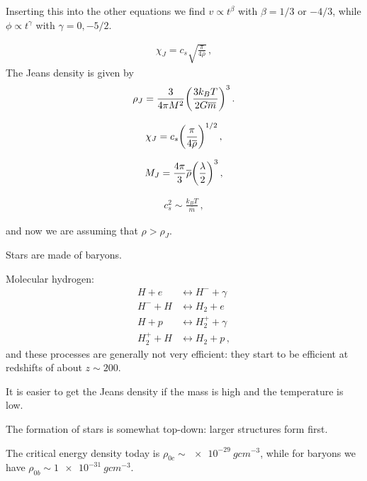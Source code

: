\documentclass[main.tex]{subfiles}
\begin{document}
Inserting this into the other equations we find \(v \propto t^{\beta } \) with \(\beta = 1/3\) or \(-4/3\), while \(\phi \propto t^{\gamma }\) with \(\gamma = 0, -5/2\). 

%
\begin{align}
    \chi_{J} = c_s \sqrt{\frac{\pi}{4 \overline{\rho}}}
  \,,
  \end{align}
%
The Jeans density is given by 
%
\begin{align}
  \rho_{J} = \frac{3}{4 \pi M^2} \qty(\frac{3k_B T}{2G \overline{m}})^{3}
\,.
\end{align}
%

%
\begin{align}
  \chi_J = c_s \qty(\frac{\pi}{4 \overline{\rho}})^{1/2}
\,,
\end{align}
%

%
\begin{align}
  M_J = \frac{4 \pi }{3} \overline{\rho} \qty(\frac{\lambda}{2})^{3}
\,,
\end{align}
%

%
\begin{align}
  c_s^2 \sim \frac{k_B T}{\overline{m}}
\,,
\end{align}
%

and now we are assuming that \(\rho > \rho _J\). 

Stars are made of baryons. 

Molecular hydrogen: 
%
\begin{subequations}
\begin{align}
  H + e &\leftrightarrow H^{-} + \gamma  \\
  H^{-} + H &\leftrightarrow H_2 + e  \\
   H+ p &\leftrightarrow H_2^{+} + \gamma  \\
  H_2^{+} + H &\leftrightarrow H_2 + p
\,,
\end{align}
\end{subequations}
%
and these processes are generally not very efficient: they start to be efficient at redshifts of about \(z \sim 200\). 

It is easier to get the Jeans density if the mass is high and the temperature is low. 

The formation of stars is somewhat top-down: larger structures form first. 

The critical energy density today is  \(\rho_{0c} \sim \SI{e-29}{g cm^{-3}}\), while for baryons we have \(\rho_{0b} \sim \SI{1e-31}{g cm^{-3}}\). 
\end{document}
